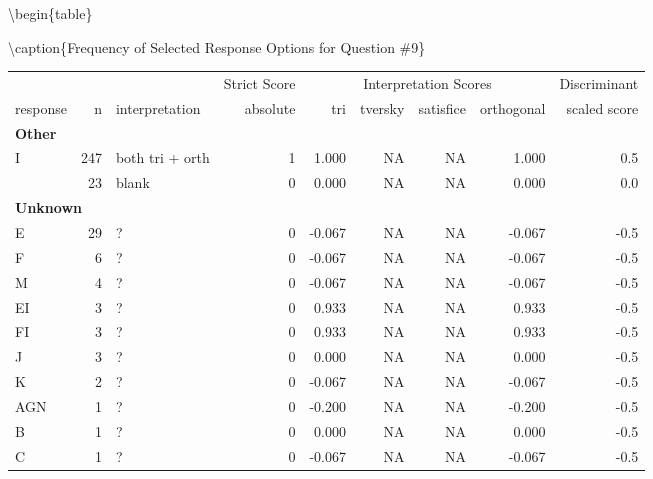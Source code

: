 \documentclass[
  letterpaper,
  DIV=11,
  numbers=noendperiod]{scrreprt}
\begin{document}
\textbackslash begin\{table\}

\textbackslash caption\{\label{tab:Q9-RESPONSES}Frequency of Selected
Response Options for Question \#9\} \centering

\begin{tabular}[t]{l|r|l|r|r|r|r|r|r}
\hline
\multicolumn{3}{c|}{ } & \multicolumn{1}{c|}{Strict Score} & \multicolumn{4}{c|}{Interpretation Scores} & \multicolumn{1}{c}{Discriminant} \\
\cline{4-4} \cline{5-8} \cline{9-9}
response & n & interpretation & absolute & tri & tversky & satisfice & orthogonal & scaled score\\
\hline
\multicolumn{9}{l}{\textbf{Other}}\\
\hline
\hspace{1em}I & 247 & both tri + orth & 1 & 1.000 & NA & NA & 1.000 & 0.5\\
\hline
\hspace{1em} & 23 & blank & 0 & 0.000 & NA & NA & 0.000 & 0.0\\
\hline
\multicolumn{9}{l}{\textbf{Unknown}}\\
\hline
\hspace{1em}E & 29 & ? & 0 & -0.067 & NA & NA & -0.067 & -0.5\\
\hline
\hspace{1em}F & 6 & ? & 0 & -0.067 & NA & NA & -0.067 & -0.5\\
\hline
\hspace{1em}M & 4 & ? & 0 & -0.067 & NA & NA & -0.067 & -0.5\\
\hline
\hspace{1em}EI & 3 & ? & 0 & 0.933 & NA & NA & 0.933 & -0.5\\
\hline
\hspace{1em}FI & 3 & ? & 0 & 0.933 & NA & NA & 0.933 & -0.5\\
\hline
\hspace{1em}J & 3 & ? & 0 & 0.000 & NA & NA & 0.000 & -0.5\\
\hline
\hspace{1em}K & 2 & ? & 0 & -0.067 & NA & NA & -0.067 & -0.5\\
\hline
\hspace{1em}AGN & 1 & ? & 0 & -0.200 & NA & NA & -0.200 & -0.5\\
\hline
\hspace{1em}B & 1 & ? & 0 & 0.000 & NA & NA & 0.000 & -0.5\\
\hline
\hspace{1em}C & 1 & ? & 0 & -0.067 & NA & NA & -0.067 & -0.5\\

\end{tabular}
\end{document}
